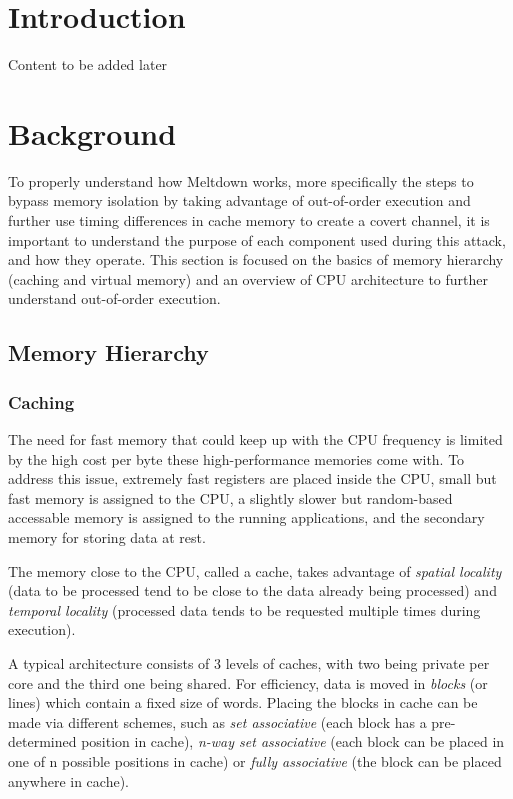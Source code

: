 \documentclass[sigconf]{acmart}
\begin{document}
\section{Introduction}

Content to be added later

\section{Background}
To properly understand how Meltdown works, more specifically the steps to bypass memory isolation by taking advantage of out-of-order execution and further use timing differences in cache memory to create a covert channel, it is important to understand the purpose of each component used during this attack, and how they operate. This section is focused on the basics of memory hierarchy (caching and virtual memory) and an overview of CPU architecture to further understand out-of-order execution. 
\subsection{Memory Hierarchy}
\subsubsection{Caching}
The need for fast memory that could keep up with the CPU frequency is limited by the high cost per byte these high-performance memories come with.
To address this issue, extremely fast registers are placed inside the CPU, small but fast memory is assigned to the CPU, a slightly slower but random-based accessable memory is assigned to the running applications, and the secondary memory for storing data at rest. 

The memory close to the CPU, called a cache, takes advantage of {\itshape spatial locality} (data to be processed tend to be close to the data already being processed) and {\itshape temporal locality} (processed data tends to be requested multiple times during execution).

A typical architecture consists of 3 levels of caches, with two being private per core and the third one being shared. For efficiency, data is moved in {\itshape blocks} (or lines) which contain a fixed size of words. Placing the blocks in cache can be made via different schemes, such as {\itshape set associative} (each block has a pre-determined position in cache), {\itshape n-way set associative} (each block can be placed in one of n possible positions in cache) or {\itshape fully associative} (the block can be placed anywhere in cache).
\end{document}
